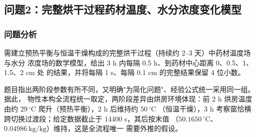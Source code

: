 \subsection{问题2：完整烘干过程药材温度、水分浓度变化模型}

\subsubsection{问题分析}

需建立预热平衡与恒温干燥构成的完整烘干过程（持续约 2–3 天）中药材温度场与水分
浓度场的数学模型，给出 3 h 内每隔 0.5 h、到药材中心距离 0、0.5、1、1.5、2 cm 处
的结果，并将每隔 1 s、每隔 0.1 cm 的完整结果保留 4 位小数。

题目指出两阶段参数有所不同，又明确"为简化问题"、经验公式统一采用同一组。据此，
物性本构全流程统一取定，两阶段差异由烘房环境体现：前 2 h 烘房温度由约
$29\,^{\circ}\mathrm{C}$ 爬升（预热平衡），2 h 后维持约 $50\,^{\circ}\mathrm{C}$
（恒温干燥），3 h 考察窗恰横跨切换过渡段；给定数据截止于 14400 s，其后按末值
（$50.1650\,^{\circ}\mathrm{C}$、$0.04986\ \mathrm{kg/kg}$）维持，这是全流程唯一
需要外推的假设。

